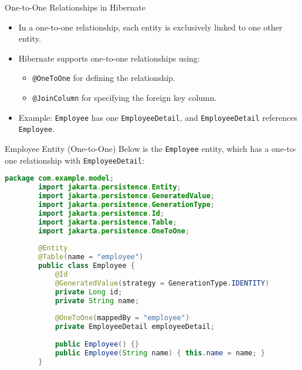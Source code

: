 \documentclass[aspectratio=169, table]{beamer}
\begin{document}
\begin{frame}{One-to-One Relationships in Hibernate}
	\vspace{20pt}
	\begin{itemize}
		\item In a one-to-one relationship, each entity is exclusively linked to one other entity.
		\item Hibernate supports one-to-one relationships using:
		\begin{itemize}
			\item \texttt{@OneToOne} for defining the relationship.
			\item \texttt{@JoinColumn} for specifying the foreign key column.
		\end{itemize}
		\item Example: \texttt{Employee} has one \texttt{EmployeeDetail}, and \texttt{EmployeeDetail} references \texttt{Employee}.
	\end{itemize}
\end{frame}

\begin{frame}[fragile]{Employee Entity (One-to-One)}
	\vspace{20pt}
	Below is the \texttt{Employee} entity, which has a one-to-one relationship with \texttt{EmployeeDetail}:
	
	\begin{lstlisting}[language=Java, style=JavaStyle]
		package com.example.model;
		import jakarta.persistence.Entity;
		import jakarta.persistence.GeneratedValue;
		import jakarta.persistence.GenerationType;
		import jakarta.persistence.Id;
		import jakarta.persistence.Table;
		import jakarta.persistence.OneToOne;
		
		@Entity
		@Table(name = "employee")
		public class Employee {
			@Id
			@GeneratedValue(strategy = GenerationType.IDENTITY)
			private Long id;
			private String name;
			
			@OneToOne(mappedBy = "employee")
			private EmployeeDetail employeeDetail;
			
			public Employee() {}
			public Employee(String name) { this.name = name; }
		}
	\end{lstlisting}
\end{frame}
\end{document}
